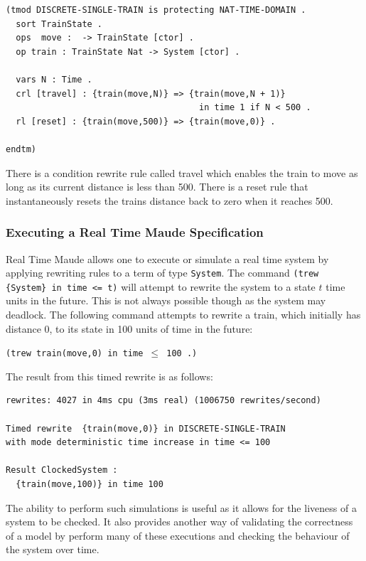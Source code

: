 \begin{lstlisting}
(tmod DISCRETE-SINGLE-TRAIN is protecting NAT-TIME-DOMAIN .
  sort TrainState .
  ops  move :  -> TrainState [ctor] .
  op train : TrainState Nat -> System [ctor] .
 
  vars N : Time .
  crl [travel] : {train(move,N)} => {train(move,N + 1)} 
                                      in time 1 if N < 500 .
  rl [reset] : {train(move,500)} => {train(move,0)} . 
         
endtm)
\end{lstlisting}
There is a condition rewrite rule called travel which enables the train to move as long as its current distance is less than 500. There is a reset rule that instantaneously resets the trains distance back to zero when it reaches 500.


\subsubsection*{Executing a Real Time Maude Specification}
Real Time Maude allows one to execute or simulate a real time system by applying rewriting rules to a term of type \texttt{System}.
The command \texttt{(trew \{System\} in time <= t)} will attempt to rewrite the system to a state $t$ time units in the future. This is not always possible though as the system may deadlock. The following command attempts to rewrite a train, which initially has distance $0$, to its state in 100 units of time in the future: 
\begin{center}
\texttt{(trew {train(move,0)} in time $\leq$ 100 .)}
\end{center}

The result from this timed rewrite is as follows:
\begin{lstlisting}
rewrites: 4027 in 4ms cpu (3ms real) (1006750 rewrites/second)

Timed rewrite  {train(move,0)} in DISCRETE-SINGLE-TRAIN 
with mode deterministic time increase in time <= 100

Result ClockedSystem :
  {train(move,100)} in time 100
\end{lstlisting}

The ability to perform such simulations is useful as it allows for the liveness of a system to be checked. It also provides another way of validating the correctness of a model by perform many of these executions and checking the behaviour of the system over time.

